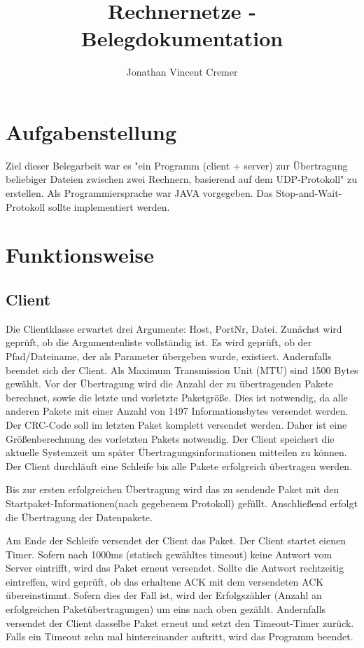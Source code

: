 \documentclass[a4paper,10pt]{article}
\begin{document}
	
	\title{Rechnernetze - Belegdokumentation}
	\author{Jonathan Vincent Cremer}
	
	\maketitle
	
	\section{Aufgabenstellung}
	Ziel dieser Belegarbeit war es "ein Programm (client + server) zur Übertragung beliebiger Dateien zwischen zwei Rechnern, basierend auf dem UDP-Protokoll" zu erstellen. Als Programmiersprache war JAVA vorgegeben. Das Stop-and-Wait-Protokoll sollte implementiert werden.
	
	\section{Funktionsweise}
	\subsection{Client}
	Die Clientklasse erwartet drei Argumente: Host, PortNr, Datei. Zunächst wird geprüft, ob die Argumentenliste vollständig ist.
	Es wird geprüft, ob der Pfad/Dateiname, der als Parameter übergeben wurde, existiert. Andernfalls beendet sich der Client. Als Maximum Transmission Unit (MTU) sind 1500 Bytes gewählt. 
	Vor der Übertragung wird die Anzahl der zu übertragenden Pakete berechnet, sowie die letzte und vorletzte Paketgröße. Dies ist notwendig, da alle anderen Pakete mit einer Anzahl von 1497 Informationsbytes versendet werden. Der CRC-Code soll im letzten Paket komplett versendet werden. Daher ist eine Größenberechnung des vorletzten Pakets notwendig.
	Der Client speichert die aktuelle Systemzeit um später	 Übertragungsinformationen mitteilen zu können.
	Der Client durchläuft eine Schleife bis alle Pakete erfolgreich übertragen werden. 
	
	Bis zur ersten erfolgreichen Übertragung wird das zu sendende Paket mit den Startpaket-Informationen(nach gegebenem Protokoll) gefüllt. Anschließend  erfolgt die Übertragung der Datenpakete.
	
	Am Ende der Schleife versendet der Client das Paket. 
	Der Client startet eienen Timer. Sofern nach 1000ms (statisch gewähltes timeout) keine Antwort vom Server eintrifft, wird das Paket erneut versendet.
	Sollte die Antwort rechtzeitig eintreffen, wird geprüft, ob das erhaltene ACK mit dem versendeten ACK übereinstimmt. Sofern dies der Fall ist, wird der Erfolgszähler (Anzahl an erfolgreichen Paketübertragungen) um eins nach oben gezählt. Andernfalls versendet der Client dasselbe Paket erneut und setzt den Timeout-Timer zurück. Falls ein Timeout zehn mal hintereinander auftritt, wird das Programm beendet.
	
\end{document}
